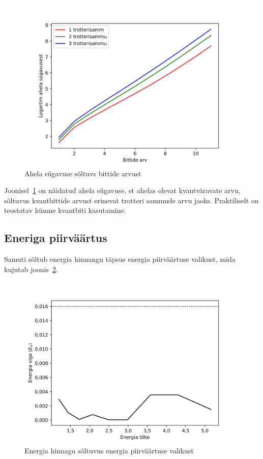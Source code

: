 \documentclass[12pt]{article}
\begin{document}
\begin{figure}[h]
    \centering
    \includegraphics{depths.jpg}
    \caption{Ahela sügavuse sõltuvs bittide arvust}
    \label{fig:depths}
\end{figure}

Joonisel~\ref{fig:depths} on näidatud ahela sügavuse, st ahelas olevat kvantväravate arvu, sõltuvus kvantbittide arvust erinevat trotteri sammude arvu jaoks.
Praktiliselt on teostatav kümne kvantbiti kasutamine.

\subsection{Eneriga piirväärtus}

Samuti sõltub energia hinnangu täpsus energia piirväärtuse valikust, mida kujutab joonis~\ref{fig:bounds}.

\begin{figure}[h]
    \centering
    \includegraphics{bounds.jpg}
    \caption{Energia hinnagu sõltuvus energia piirväärtuse valikust}
    \label{fig:bounds}
\end{figure}
\end{document}
